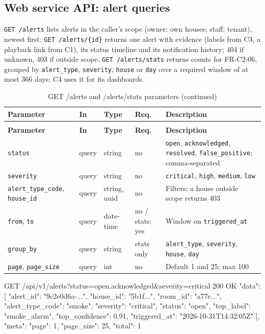 \subsection{Web service API: alert queries}
\texttt{GET /alerts} lists alerts in the caller's scope (owner: own houses; staff: tenant), newest first.
\texttt{GET /alerts/\{id\}} returns one alert with evidence (labels from C3, a playback link from C1), its status
timeline and its notification history; 404 if unknown, 403 if outside scope. \texttt{GET /alerts/stats} returns
counts for FR-C2-06, grouped by \texttt{alert\_type}, \texttt{severity}, \texttt{house} or \texttt{day} over a required
window of at most 366 days; C4 uses it for its dashboards.
\begin{longtable}{L{2.6cm}L{1.3cm}L{1.6cm}L{1.0cm}L{7.4cm}}
\caption{GET /alerts and /alerts/stats parameters}\\
\toprule
\textbf{Parameter} & \textbf{In} & \textbf{Type} & \textbf{Req.} & \textbf{Description} \\
\midrule
\endfirsthead
\caption[]{GET /alerts and /alerts/stats parameters (continued)}\\
\toprule
\textbf{Parameter} & \textbf{In} & \textbf{Type} & \textbf{Req.} & \textbf{Description} \\
\midrule
\endhead
\texttt{status} & query & string & no & \texttt{open}, \texttt{acknowledged}, \texttt{resolved}, \texttt{false\_positive}; comma-separated \\
\texttt{severity} & query & string & no & \texttt{critical}, \texttt{high}, \texttt{medium}, \texttt{low} \\
\texttt{alert\_type\_code}, \texttt{house\_id} & query & string, uuid & no & Filters; a house outside scope returns 403 \\
\texttt{from}, \texttt{to} & query & date-time & no / stats: yes & Window on \texttt{triggered\_at} \\
\texttt{group\_by} & query & string & stats only & \texttt{alert\_type}, \texttt{severity}, \texttt{house}, \texttt{day} \\
\texttt{page}, \texttt{page\_size} & query & int & no & Default 1 and 25; max 100 \\
\bottomrule
\end{longtable}
\begin{Shaded}
\begin{Code}
GET /api/v1/alerts?status=open,acknowledged&severity=critical          200 OK
{ "data": [ { "alert_id": "9c2e0d6a-...", "house_id": "5b1f...", "room_id": "a77c...", "alert_type_code": "smoke",
              "severity": "critical", "status": "open", "top_label": "smoke_alarm", "top_confidence": 0.91,
              "triggered_at": "2026-10-31T14:32:05Z" } ], "meta": { "page": 1, "page_size": 25, "total": 1 } }
\end{Code}
\end{Shaded}

